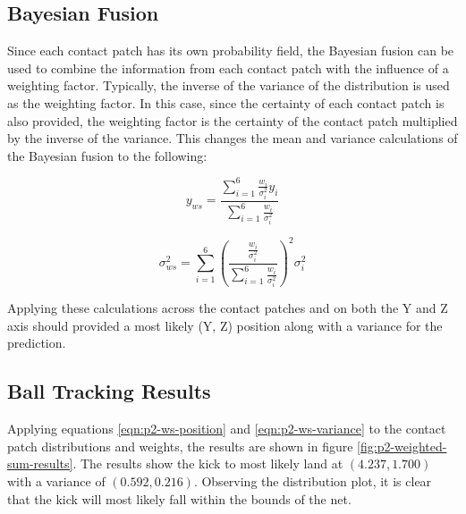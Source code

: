 \documentclass[12pt]{article}
\begin{document}
\subsection{Bayesian Fusion}
Since each contact patch has its own probability field, the Bayesian fusion can be used to combine the information from each contact patch with the influence of a weighting factor. Typically, the inverse of the variance of the distribution is used as the weighting factor. In this case, since the certainty of each contact patch is also provided, the weighting factor is the certainty of the contact patch multiplied by the inverse of the variance. This changes the mean and variance calculations of the Bayesian fusion to the following:

\begin{equation} 
    \label{eqn:p2-ws-position}
    y_{ws} = \frac{\sum_{i=1}^{6} \frac{w_i}{\sigma_i^2} y_i}{\sum_{i=1}^{6} \frac{w_i}{\sigma_i^2}}
\end{equation}

\begin{equation} 
    \label{eqn:p2-ws-variance}
    \sigma_{ws}^2 = \sum_{i=1}^{6} \left( \frac{\frac{w_i}{\sigma_i^2}}{\sum_{i=1}^6 \frac{w_i}{\sigma_i^2}} \right)^2 \sigma_i^2
\end{equation}

Applying these calculations across the contact patches and on both the Y and Z axis should provided a most likely (Y, Z) position along with a variance for the prediction.

\subsection{Ball Tracking Results}
Applying equations \ref{eqn:p2-ws-position} and \ref{eqn:p2-ws-variance} to the contact patch distributions and weights, the results are shown in figure \ref{fig:p2-weighted-sum-results}. The results show the kick to most likely land at $(4.237, 1.700)$ with a variance of $(0.592, 0.216)$. Observing the distribution plot, it is clear that the kick will most likely fall within the bounds of the net.
\end{document}
